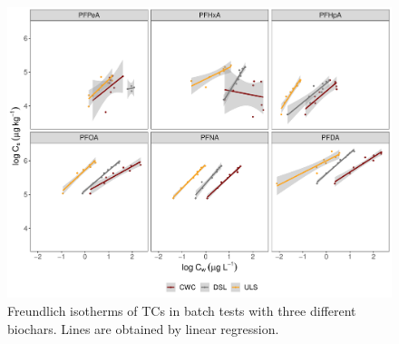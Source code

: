 \begin{figure}[tb]
    \centering
    \includegraphics[width=\textwidth]{R/figs/Sorption_isotherms_single_BC.pdf}
    \caption{Freundlich isotherms of TCs in batch tests with three different biochars. Lines are obtained by linear regression.}
    \label{fig:sorption_isotherms}
\end{figure}

